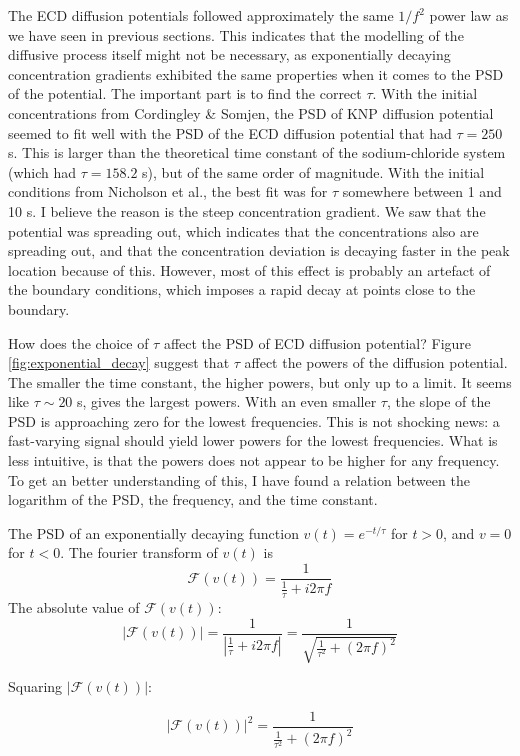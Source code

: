 \documentclass{uiophd}
\begin{document}
The ECD diffusion potentials followed approximately the same $1/f^2$ power law as we have seen in previous sections. This indicates that the modelling of the diffusive process itself might not be necessary, as exponentially decaying concentration gradients exhibited the same properties when it comes to the PSD of the potential. The important part is to find the correct $\tau$. With the initial concentrations from Cordingley \& Somjen, the PSD of KNP diffusion potential seemed to fit well with the PSD of the ECD diffusion potential that had $\tau=250$ s. This is larger than the theoretical time constant of the sodium-chloride system (which had $\tau = 158.2$ s), but of the same order of magnitude. With the initial conditions from Nicholson et al., the best fit was for $\tau$ somewhere between 1 and 10 s. I believe the reason is the steep concentration gradient. We saw that the potential was spreading out, which indicates that the concentrations also are spreading out, and that the concentration deviation is decaying faster in the peak location because of this. However, most of this effect is probably an artefact of the boundary conditions, which imposes a rapid decay at points close to the boundary.


How does the choice of $\tau$ affect the PSD of ECD diffusion potential? Figure \ref{fig:exponential_decay} suggest that $\tau$ affect the powers of the diffusion potential. The smaller the time constant, the higher powers, but only up to a limit. It seems like $\tau \sim 20 $ s, gives the largest powers. With an even smaller $\tau$, the slope of the PSD is approaching zero for the lowest frequencies. This is not shocking news: a fast-varying signal should yield lower powers for the lowest frequencies. What is less intuitive, is that the powers does not appear to be higher for any frequency. To get an better understanding of this, I have found a relation between the logarithm of the PSD, the frequency, and the time constant. 

The PSD of an exponentially decaying function $v(t) = e^{-t/\tau}$ for $t>0$, and $v=0$ for $t<0$.
The fourier transform of $v(t)$ is
$$
\mathcal{F}(v(t))= \frac{1}{\frac{1}{\tau} +i2\pi f}
$$
The absolute value of $\mathcal{F}(v(t))$:
$$
|\mathcal{F}(v(t))| = \frac{1}{|\frac{1}{\tau} +i2\pi f|}=\frac{1}{\sqrt{\frac{1}{\tau^2} +(2\pi f)^2}}
$$

Squaring $|\mathcal{F}(v(t))|$:

$$
|\mathcal{F}(v(t))|^2= \frac{1}{\frac{1}{\tau^2} +(2\pi f)^2}
$$
\end{document}
